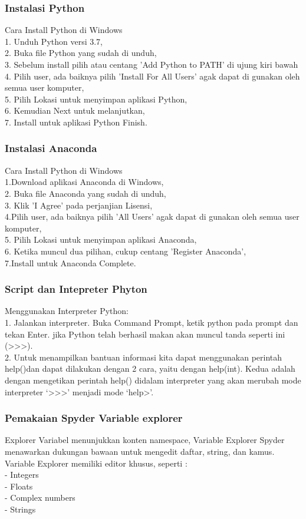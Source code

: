 \subsubsection{Instalasi Python}

Cara Install Python di Windows\\
1. Unduh Python versi 3.7,\\
2. Buka file Python yang sudah di unduh,\\
3. Sebelum install pilih atau centang 'Add Python to PATH' di ujung kiri bawah
4. Pilih user, ada baiknya pilih 'Install For All Users' agak dapat di gunakan oleh semua user komputer,\\
5. Pilih Lokasi untuk menyimpan aplikasi Python,\\
6. Kemudian Next untuk melanjutkan,\\
7. Install untuk aplikasi Python Finish.
\subsubsection{Instalasi Anaconda}
Cara Install Python di Windows\\
1.Download aplikasi Anaconda di Windows, \\
2. Buka file Anaconda yang sudah di unduh,\\
3. Klik 'I Agree' pada perjanjian Lisensi,\\
4.Pilih user, ada baiknya pilih 'All Users' agak dapat di gunakan oleh semua user komputer,\\
5. Pilih Lokasi untuk menyimpan aplikasi Anaconda,\\
6. Ketika muncul dua pilihan, cukup centang 'Register Anaconda',\\
7.Install untuk Anaconda Complete.
\subsubsection{Script dan Intepreter Phyton}
Menggunakan Interpreter Python: \\
1. Jalankan interpreter. Buka Command Prompt, ketik python pada prompt dan tekan Enter. jika Python telah berhasil makan akan muncul tanda seperti ini (>>>).\\
2. Untuk menampilkan bantuan informasi kita dapat menggunakan perintah help()dan dapat dilakukan dengan 2 cara, yaitu dengan   help(int). Kedua adalah dengan mengetikan perintah help() didalam interpreter yang akan merubah mode interpreter ‘>>>’ menjadi mode ‘help>’.

\subsubsection{Pemakaian Spyder Variable explorer}
Explorer Variabel menunjukkan konten namespace, Variable Explorer Spyder menawarkan dukungan bawaan untuk mengedit daftar, string, dan kamus. Variable Explorer memiliki editor khusus, seperti :\\
- Integers\\
- Floats\\
- Complex numbers\\
- Strings
